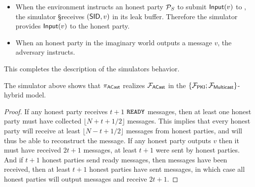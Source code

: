 \begin{itemize}
\item When the environment instructs an honest party $\P_S$ to submit $\msf{Input}(v)$ to , the simulator \S receives $(\msf{SID},v)$ in its leak buffer. Therefore the simulator provides $\msf{Input}(v)$ to the honest party.
\item When an honest party in the imaginary world outputs a message $v$, the adversary instructs.
\end{itemize}

This completes the description of the simulators behavior.

\begin{theorem}
The simulator above shows that $\proto{ACast}$ realizes $\F{ACast}$ in the $\{\F{PKI};\F{Multicast}\}$-hybrid model.
\end{theorem}

\begin{proof}
If any honest party receives $t+1$ $\mtt{READY}$ messages, then at least one honest party must have collected $\lfloor N + t + 1 / 2 \rfloor$  messages. 
This implies that every honest party will receive at least $\lfloor N - t+1 / 2 \rfloor$  messages from honest parties, and will thus be able to reconstruct the message.
If any honest party outputs $v$ then it must have received $2t+1$  messages, at least $t+1$ were sent by honest parties. And if $t+1$ honest parties send ready messages, then  messages have been received, then at least $t+1$ honest parties have sent  messages, in which case all honest parties will output  messages and receive $2t+1$.
\end{proof}
